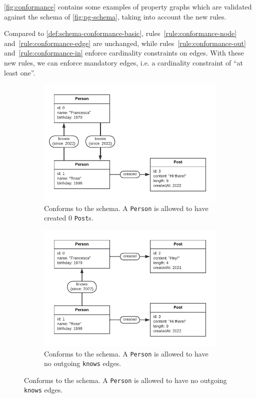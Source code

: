 \documentclass{article}
\theoremstyle{definition}
\begin{document}
\autoref{fig:conformance} contains some examples of property graphs which are validated against the schema of \autoref{fig:pg-schema}, taking into account the new rules.

Compared to \autoref{def:schema-conformance-basic}, rules~\ref{rule:conformance-node} and~\ref{rule:conformance-edge} are unchanged, while rules~\ref{rule:conformance-out} and~\ref{rule:conformance-in} enforce cardinality constraints on edges. With these new rules, we can enforce mandatory edges, i.e. a cardinality constraint of ``at least one''.

\begin{figure}[t]
  \centering
  \begin{subfigure}[t]{0.45\textwidth}
    \centering
    \includegraphics[width=\textwidth]{figures/conformance-out.pdf}
    \caption{Conforms to the schema. A \texttt{Person} is allowed to have created 0 \texttt{Post}s.}
    \label{fig:conformance-node}
  \end{subfigure}
  \hfill
  \begin{subfigure}[t]{0.45\textwidth}
    \centering
    \includegraphics[width=\textwidth]{figures/conformance-out-2.pdf}
    \caption{Conforms to the schema. A \texttt{Person} is allowed to have no outgoing \texttt{knows} edges.}
    \label{fig:conformance-edge}
  \end{subfigure}


\end{figure}
\end{document}
